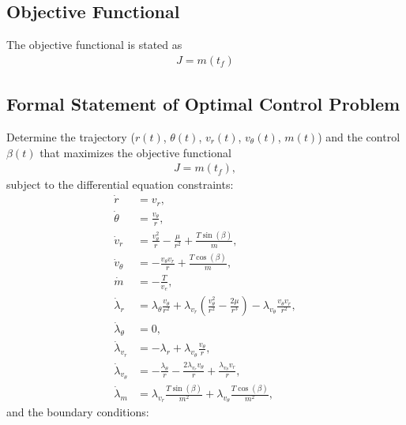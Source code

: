 \documentclass[]{article}
\begin{document}
\subsection{Objective Functional}
The objective functional is stated as
\begin{align}
	J = m(t_f)
\end{align}
\subsection{Formal Statement of Optimal Control Problem}
Determine the trajectory (\(r(t)\), \(\theta(t)\), \(v_r(t)\), \(v_\theta(t)\), \(m(t)\)) and the control \(\beta(t)\) that maximizes the objective functional
\begin{align*}
	J = m(t_f),
\end{align*}
subject to the differential equation constraints:
\begin{align*}
	\dot{r}        &= v_r, \\
	\dot{\theta}   &= \frac{v_\theta}{r}, \\
	\dot{v}_r      &= \frac{v^2_{\theta}}{r} - \frac{\mu}{r^2} + \frac{T\sin(\beta)}{m}, \\
    \dot{v}_\theta &= -\frac{v_{\theta}v_{r}}{r}   + \frac{T\cos(\beta)}{m}, \\
	\dot{m}        &= -\frac{T}{v_e}, \\
	\dot{\lambda}_r      &=\lambda_\theta\frac{v_\theta}{r^2} + \lambda_{v_r}(\frac{v_{\theta}^2}{r^2} - \frac{2\mu}{r^3}) - \lambda_{v_\theta}\frac{v_{\theta}v_r}{r^2},\\
    \dot{\lambda}_\theta &= 0,                                                                                                    \\
    \dot{\lambda}_{v_r}  &= -\lambda_r + \lambda_{v_\theta}\frac{v_\theta}{r},                                                    \\
    \dot{\lambda}_{v_\theta} &= -\frac{\lambda_\theta}{r} - \frac{2\lambda_{v_r}v_\theta}{r} + \frac{\lambda_{v_\theta}v_r}{r}, \\
    \dot{\lambda}_m          &= \lambda_{v_r}\frac{T\sin(\beta)}{m^2} + \lambda_{v_\theta}\frac{T\cos(\beta)}{m^2},                      	
\end{align*}
and the boundary conditions:                                                                                                                                                                
\end{document}
